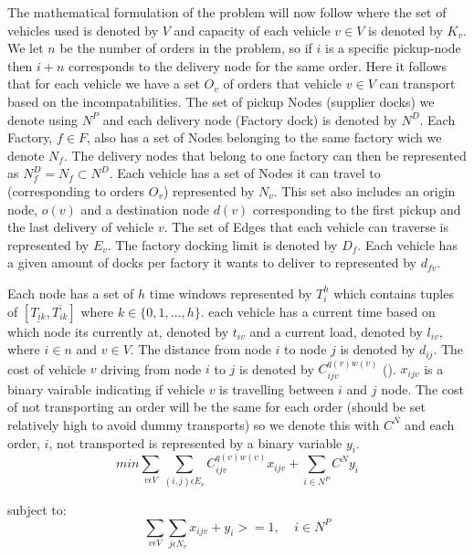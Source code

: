 \documentclass[a4paper,12pt]{article}
\begin{document}
The mathematical formulation of the problem will now follow where the set of vehicles used is denoted by $V$ and capacity of each vehicle $v \in V$ is denoted by $K_v$. We let $n$ be the number of orders in the problem, so if $i$ is a specific pickup-node then $i+n$ corresponds to the delivery node for the same order. Here it follows that for each vehicle we have a set $O_v$ of orders that vehicle $v \in V$ can transport based on the incompatabilities. The set of pickup Nodes (supplier docks) we denote using $N^P$ and each delivery node (Factory dock) is denoted by $N^D$. Each Factory, $f \in F$, also has a set of Nodes belonging to the same factory wich we denote $N_f$. The delivery nodes that belong to one factory can then be represented as $N_f^D = N_f \subset N^D$. Each vehicle has a set of Nodes it can travel to (corresponding to orders $O_v$) represented by $N_v$. This set also includes an origin node, $o(v)$ and a destination node $d(v)$ corresponding to the first pickup and the last delivery of vehicle $v$. The set of Edges that each vehicle can traverse is represented by $E_v$. The factory docking limit is denoted by $D_f$. Each vehicle has a given amount of docks per factory it wants to deliver to represented by $d_{fv}$. \par 
Each node has a set of $h$ time windows represented by $T_i^h$ which contains tuples of $[ \underline{T_{ik}},  \overline{T_{ik}} ]$ where $k \in \{0,1,...,h\}$. each vehicle has a current time based on which node its currently at, denoted by $t_{iv}$ and a current load, denoted by $l_{iv}$, where $i \in n$ and $v \in V$. The distance from node $i$ to node $j$ is denoted by $d_{ij}$. The cost of vehicle $v$ driving from node $i$ to $j$ is denoted by $C_{ijv}^{q(v)w(v)}$  (). $x_{ijv}$ is a binary vairable indicating if vehicle $v$ is travelling between $i$ and $j$ node. The cost of not transporting an order will be the same for each order (should be set relatively high to avoid dummy transports) so we denote this with $C^N$ and each order, $i$,  not transported is represented by a binary variable $y_i$. 
\begin{equation}
\label{eq:1}
min\sum_{v\epsilon V} \sum_{(i,j)\epsilon E_v} C_{ijv}^{q(v)w(v)}x_{ijv} + \sum_{i\in N^P}C^Ny_i
\end{equation}

subject to:
\begin{equation} \label{eq:2}
\sum_{v\epsilon V}\sum_{j\epsilon N_v} x_{ijv} + y_i >= 1, ~~~~~ i \in N^P
\end{equation}
\end{document}
